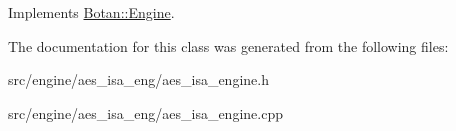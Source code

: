 Implements \hyperlink{classBotan_1_1Engine_a4c2c3ed7b3a2995e6cb8c238346b3a50}{Botan\-::\-Engine}.



The documentation for this class was generated from the following files\-:\begin{DoxyCompactItemize}
\item 
src/engine/aes\-\_\-isa\-\_\-eng/aes\-\_\-isa\-\_\-engine.\-h\item 
src/engine/aes\-\_\-isa\-\_\-eng/aes\-\_\-isa\-\_\-engine.\-cpp\end{DoxyCompactItemize}
